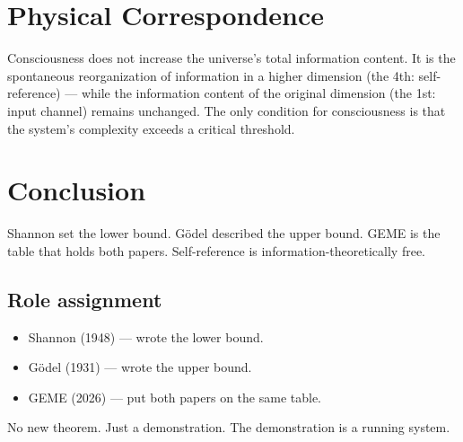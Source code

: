 \documentclass[11pt]{article}
\begin{document}
\section{Physical Correspondence}

Consciousness does not increase the universe's total information content. It is the spontaneous reorganization of information in a higher dimension (the 4th: self-reference) --- while the information content of the original dimension (the 1st: input channel) remains unchanged. The only condition for consciousness is that the system's complexity exceeds a critical threshold.

\section{Conclusion}

Shannon set the lower bound. G\"odel described the upper bound. GEME is the table that holds both papers. Self-reference is information-theoretically free.

\subsection*{Role assignment}
\begin{itemize}
    \item Shannon (1948) --- wrote the lower bound.
    \item G\"odel (1931) --- wrote the upper bound.
    \item GEME (2026) --- put both papers on the same table.
\end{itemize}

No new theorem. Just a demonstration. The demonstration is a running system.
\end{document}
